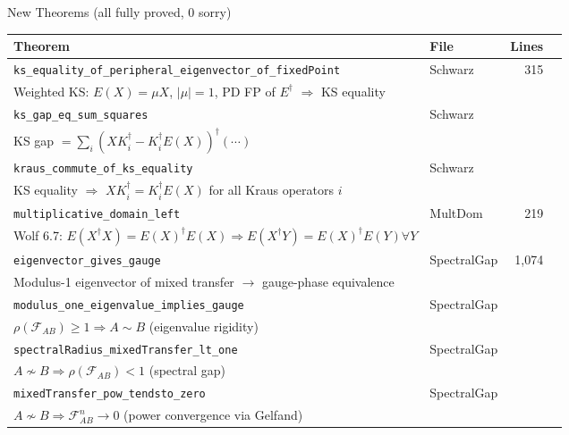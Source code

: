 \documentclass[aspectratio=169,10pt]{beamer}
\begin{document}
\begin{frame}{New Theorems (all fully proved, 0 sorry)}
    \vspace{-0.7em}

    {\footnotesize
    \begin{tabular}{@{}p{5.8cm} l r c@{}}
        \toprule
        \textbf{Theorem} & \textbf{File} & \textbf{Lines} & \\
        \midrule
        \rowcolor{cardbg}
        \texttt{ks\_equality\_of\_peripheral\_eigenvector\_of\_fixedPoint}
          & Schwarz & 315 & \proved{} \\
        {\tiny Weighted KS: $E(X)=\mu X$, $|\mu|=1$, PD FP of $E^\dagger$ $\Rightarrow$ KS equality} & & & \\
        \texttt{ks\_gap\_eq\_sum\_squares}
          & Schwarz & & \proved{} \\
        {\tiny KS gap $= \sum_i (XK_i^\dagger - K_i^\dagger E(X))^\dagger(\cdots)$} & & & \\
        \rowcolor{cardbg}
        \texttt{kraus\_commute\_of\_ks\_equality}
          & Schwarz & & \proved{} \\
        {\tiny KS equality $\Rightarrow$ $XK_i^\dagger = K_i^\dagger E(X)$ for all Kraus operators $i$} & & & \\
        \texttt{multiplicative\_domain\_left}
          & MultDom & 219 & \proved{} \\
        {\tiny Wolf 6.7: $E(X^\dagger X)=E(X)^\dagger E(X) \Rightarrow E(X^\dagger Y)=E(X)^\dagger E(Y) \forall Y$} & & & \\
        \rowcolor{cardbg}
        \texttt{eigenvector\_gives\_gauge}
          & SpectralGap & 1{,}074 & \proved{} \\
        {\tiny Modulus-1 eigenvector of mixed transfer $\to$ gauge-phase equivalence} & & & \\
        \texttt{modulus\_one\_eigenvalue\_implies\_gauge}
          & SpectralGap & & \proved{} \\
        {\tiny $\rho(\mathcal{F}_{AB})\geq 1 \Rightarrow A \sim B$ (eigenvalue rigidity)} & & & \\
        \rowcolor{cardbg}
        \texttt{spectralRadius\_mixedTransfer\_lt\_one}
          & SpectralGap & & \proved{} \\
        {\tiny $A \not\sim B \Rightarrow \rho(\mathcal{F}_{AB}) < 1$ (spectral gap)} & & & \\
        \texttt{mixedTransfer\_pow\_tendsto\_zero}
          & SpectralGap & & \proved{} \\
        {\tiny $A \not\sim B \Rightarrow \mathcal{F}_{AB}^n \to 0$ (power convergence via Gelfand)} & & & \\
        \bottomrule
    \end{tabular}
    }
\end{frame}
\end{document}
